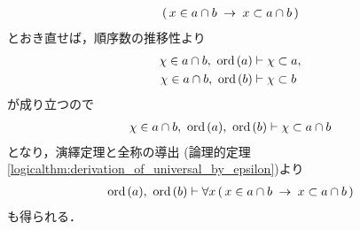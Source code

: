 \begin{sketch}
\begin{description}
\begin{align}
					(\, x \in a \cap b \hspace{0.25em}\rightarrow\hspace{0.25em} x \subset a \cap b\, )
				\end{align}
				とおき直せば，順序数の推移性より
				\begin{align}
					\chi \in a \cap b,\ \operatorname*{ord}\hspace{0.15em}(a) &\vdash \chi \subset a, \\
					\chi \in a \cap b,\ \operatorname*{ord}\hspace{0.15em}(b) &\vdash \chi \subset b
				\end{align}
				が成り立つので
				\begin{align}
					\chi \in a \cap b,\ \operatorname*{ord}\hspace{0.15em}(a),\ \operatorname*{ord}\hspace{0.15em}(b) \vdash \chi \subset a \cap b
				\end{align}
				となり，演繹定理と全称の導出
				(論理的定理\ref{logicalthm:derivation_of_universal_by_epsilon})より
				\begin{align}
					\operatorname*{ord}\hspace{0.15em}(a),\ \operatorname*{ord}\hspace{0.15em}(b) \vdash 
					\forall x\, (\, x \in a \cap b \hspace{0.25em}\rightarrow\hspace{0.25em} x \subset a \cap b\, )
				\end{align}
				も得られる．
				

\end{description}
\end{sketch}

